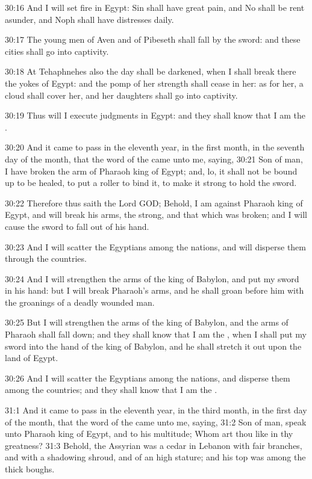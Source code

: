 30:16 And I will set fire in Egypt: Sin shall have great pain, and No
shall be rent asunder, and Noph shall have distresses daily.

30:17 The young men of Aven and of Pibeseth shall fall by the sword:
and these cities shall go into captivity.

30:18 At Tehaphnehes also the day shall be darkened, when I shall
break there the yokes of Egypt: and the pomp of her strength shall
cease in her: as for her, a cloud shall cover her, and her daughters
shall go into captivity.

30:19 Thus will I execute judgments in Egypt: and they shall know that
I am the \LORD.

30:20 And it came to pass in the eleventh year, in the first month, in
the seventh day of the month, that the word of the \LORD came unto me,
saying, 30:21 Son of man, I have broken the arm of Pharaoh king of
Egypt; and, lo, it shall not be bound up to be healed, to put a roller
to bind it, to make it strong to hold the sword.

30:22 Therefore thus saith the Lord GOD; Behold, I am against Pharaoh
king of Egypt, and will break his arms, the strong, and that which was
broken; and I will cause the sword to fall out of his hand.

30:23 And I will scatter the Egyptians among the nations, and will
disperse them through the countries.

30:24 And I will strengthen the arms of the king of Babylon, and put
my sword in his hand: but I will break Pharaoh's arms, and he shall
groan before him with the groanings of a deadly wounded man.

30:25 But I will strengthen the arms of the king of Babylon, and the
arms of Pharaoh shall fall down; and they shall know that I am the
\LORD, when I shall put my sword into the hand of the king of Babylon,
and he shall stretch it out upon the land of Egypt.

30:26 And I will scatter the Egyptians among the nations, and disperse
them among the countries; and they shall know that I am the \LORD.

31:1 And it came to pass in the eleventh year, in the third month, in
the first day of the month, that the word of the \LORD came unto me,
saying, 31:2 Son of man, speak unto Pharaoh king of Egypt, and to his
multitude; Whom art thou like in thy greatness?  31:3 Behold, the
Assyrian was a cedar in Lebanon with fair branches, and with a
shadowing shroud, and of an high stature; and his top was among the
thick boughs.

